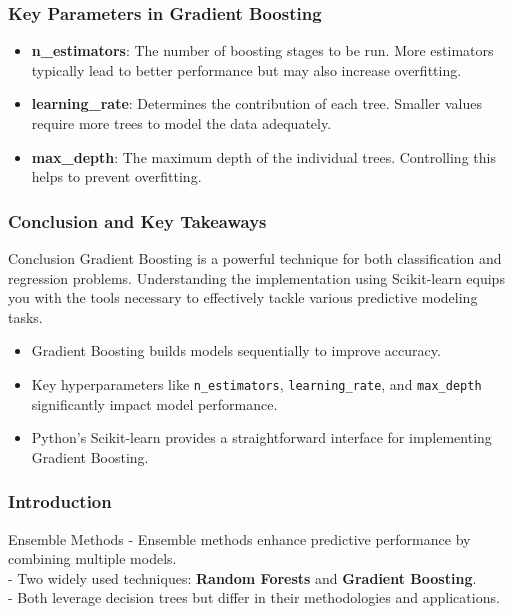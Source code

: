 \documentclass[aspectratio=169]{beamer}
\begin{document}
\begin{frame}
    \frametitle{Key Parameters in Gradient Boosting}
    \begin{itemize}
        \item \textbf{n\_estimators}: The number of boosting stages to be run. More estimators typically lead to better performance but may also increase overfitting.
        \item \textbf{learning\_rate}: Determines the contribution of each tree. Smaller values require more trees to model the data adequately.
        \item \textbf{max\_depth}: The maximum depth of the individual trees. Controlling this helps to prevent overfitting.
    \end{itemize}
\end{frame}

\begin{frame}
    \frametitle{Conclusion and Key Takeaways}
    \begin{block}{Conclusion}
        Gradient Boosting is a powerful technique for both classification and regression problems. Understanding the implementation using Scikit-learn equips you with the tools necessary to effectively tackle various predictive modeling tasks.
    \end{block}
    \begin{itemize}
        \item Gradient Boosting builds models sequentially to improve accuracy.
        \item Key hyperparameters like \texttt{n\_estimators}, \texttt{learning\_rate}, and \texttt{max\_depth} significantly impact model performance.
        \item Python's Scikit-learn provides a straightforward interface for implementing Gradient Boosting.
    \end{itemize}
\end{frame}

\begin{frame}
    \frametitle{Introduction}
    \begin{block}{Ensemble Methods}
        - Ensemble methods enhance predictive performance by combining multiple models. \\
        - Two widely used techniques: \textbf{Random Forests} and \textbf{Gradient Boosting}. \\
        - Both leverage decision trees but differ in their methodologies and applications.
    \end{block}
\end{frame}
\end{document}
